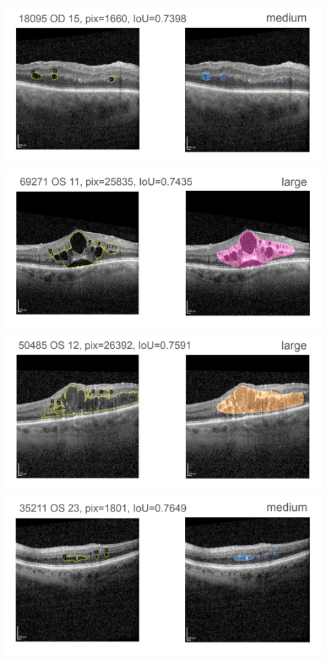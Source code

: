 \includegraphics[width=0.9\textwidth]{./pic/Segmentierung/Segmentierungsergebnisse/29.PNG}
\includegraphics[width=0.9\textwidth]{./pic/Segmentierung/Segmentierungsergebnisse/30.PNG}
\includegraphics[width=0.9\textwidth]{./pic/Segmentierung/Segmentierungsergebnisse/31.PNG}
\includegraphics[width=0.9\textwidth]{./pic/Segmentierung/Segmentierungsergebnisse/32.PNG}
